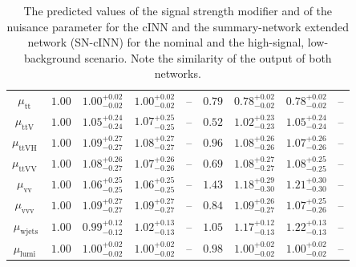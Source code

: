 \begin{table}[h!]
\begin{tabular}{ccccccccc}
		$\mu_\text{tt   } $ & $1.00$ & $1.00^{+0.02}_{-0.02}$ & $1.00^{+0.02}_{-0.02}$ & --                        & $0.79 $ & $0.78^{+0.02}_{-0.02}$  & $0.78^{+0.02}_{-0.02}$  & -- \\[0.3em]
		$\mu_\text{ttV  } $ & $1.00$ & $1.05^{+0.24}_{-0.24}$ & $1.07^{+0.25}_{-0.25}$ & --                        & $0.52 $ & $1.02^{+0.23}_{-0.23}$  & $1.05^{+0.24}_{-0.24}$  & -- \\[0.3em]
		$\mu_\text{ttVH } $ & $1.00$ & $1.09^{+0.27}_{-0.27}$ & $1.08^{+0.27}_{-0.27}$ & --                        & $0.96 $ & $1.08^{+0.26}_{-0.26}$  & $1.07^{+0.26}_{-0.26}$  & -- \\[0.3em]
		$\mu_\text{ttVV } $ & $1.00$ & $1.08^{+0.26}_{-0.27}$ & $1.07^{+0.26}_{-0.26}$ & --                        & $0.69 $ & $1.08^{+0.27}_{-0.27}$  & $1.08^{+0.25}_{-0.25}$  & -- \\[0.3em]
		$\mu_\text{vv   } $ & $1.00$ & $1.06^{+0.25}_{-0.25}$ & $1.06^{+0.25}_{-0.25}$ & --                        & $1.43 $ & $1.18^{+0.29}_{-0.30}$  & $1.21^{+0.30}_{-0.30}$  & -- \\[0.3em]
		$\mu_\text{vvv  } $ & $1.00$ & $1.09^{+0.27}_{-0.27}$ & $1.09^{+0.27}_{-0.27}$ & --                        & $0.84 $ & $1.09^{+0.26}_{-0.27}$  & $1.07^{+0.25}_{-0.26}$  & -- \\[0.3em]
		$\mu_\text{wjets} $ & $1.00$ & $0.99^{+0.12}_{-0.12}$ & $1.02^{+0.13}_{-0.13}$ & --                        & $1.05 $ & $1.17^{+0.12}_{-0.13}$  & $1.22^{+0.13}_{-0.13}$  & -- \\[0.3em]
		$\mu_\text{lumi } $ & $1.00$ & $1.00^{+0.02}_{-0.02}$ & $1.00^{+0.02}_{-0.02}$ & --                        & $0.98 $ & $1.00^{+0.02}_{-0.02}$  & $1.00^{+0.02}_{-0.02}$  & -- \\[0.3em]
		\hline
	\end{tabular}
	\caption{The predicted values of the signal strength modifier and of the nuisance parameter for the cINN and the summary-network extended network (SN-cINN) for the nominal and the high-signal, low-background scenario. Note the similarity of the output of both networks.}
	\label{tab:inference_res}
\end{table}

